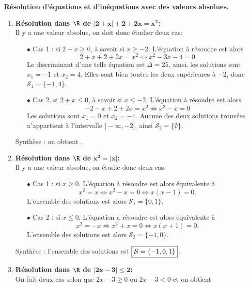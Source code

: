 \begin{correction}  \; \textbf{R\'esolution d'\'equations et d'in\'equations avec des valeurs absolues.}\\
\begin{enumerate}
\item \textbf{R\'esolution dans $\mathbf{\R}$ de $\mathbf{|2+x|+2+2x=x^2}$:}\\
\noindent Il y a une valeur absolue, on doit donc \'etudier deux cas:
\begin{itemize}
 \item[$\bullet$] Cas 1 : si $2+x\geq 0$, \`a savoir si $x\geq -2$. L'\'equation \`a r\'esoudre est alors
$$2+x+2+2x=x^2\Leftrightarrow x^2-3x-4=0$$
Le discriminant d'une telle \'equation est $\Delta=25$, ainsi, les solutions sont $x_1=-1$ et $x_2=4$. Elles sont bien toutes les deux sup\'erieures \`a $-2$, donc $\mathcal{S}_1=\lbrace -1,4 \rbrace$.
\item[$\bullet$] Cas 2, si $2+x\leq 0$, \`a savoir si $x\leq -2$. L'\'equation \`a r\'esoudre est alors
$$-2-x+2+2x=x^2\Leftrightarrow x^2-x=0$$
Les solutions sont $x_1=0$ et $x_2=-1$. Aucune des deux solutions trouv\'ees n'appartient  \`a l'intervalle $\rbrack -\infty,-2\rbrack$, ainsi $\mathcal{S}_2=\lbrace  \emptyset\rbrace$.
\end{itemize}
Synth\`ese : on obtient . 
\item \textbf{R\'esolution dans $\mathbf{\R}$ de $\mathbf{x^2=|x|}$:}\\
\noindent Il y a une valeur absolue, on \'etudie donc deux cas:
\begin{itemize}
 \item[$\bullet$] Cas 1 : si $x\geq 0$. L'\'equation \`a r\'esoudre est alors \'equivalente \`a
$$x^2=x\Leftrightarrow x^2-x=0\Leftrightarrow x(x-1)=0.$$
L'ensemble des solutions est alors $\mathcal{S}_1=\lbrace 0,1 \rbrace$.
\item[$\bullet$] Cas 2 : si $x\leq 0$. L'\'equation \`a r\'esoudre est alors \'equivalente \`a
$$x^2=-x\Leftrightarrow x^2+x=0\Leftrightarrow x(x+1)=0.$$
L'ensemble des solutions est alors $\mathcal{S}_2=\lbrace -1,0 \rbrace$.
\end{itemize}
Synth\`ese : l'ensemble des solutions est $\fbox{$  \mathcal{S}=\lbrace -1,0,1 \rbrace $}$.
\item \textbf{R\'esolution dans $\mathbf{\R}$ de $\mathbf{|2x-3|\leq 2}$:}\\
\noindent On fait deux cas selon que $2x-3\geq 0$ ou $2x-3<0$ et on obtient 

\end{enumerate}
\end{correction}
